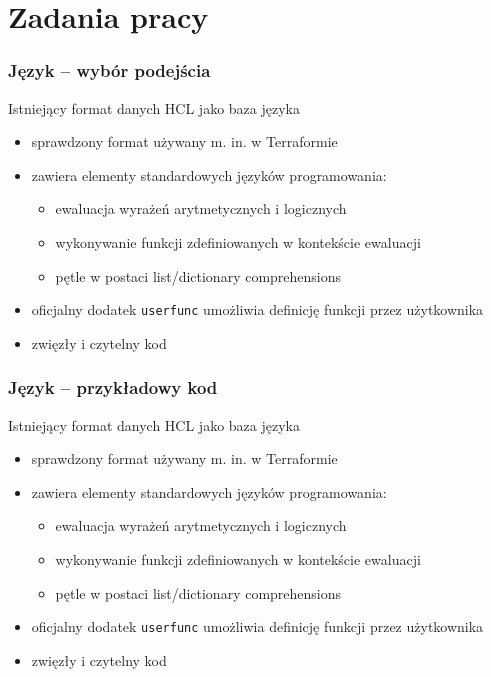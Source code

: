 \documentclass{beamer}
\begin{document}
\section{Zadania pracy}

\begin{frame}
	\frametitle{Język -- wybór podejścia}
	Istniejący format danych HCL jako baza języka
	\begin{itemize}
		\item sprawdzony format używany m. in. w Terraformie\footnotemark
		\item zawiera elementy standardowych języków programowania:
		      \begin{itemize}
			      \item ewaluacja wyrażeń arytmetycznych i logicznych
			      \item wykonywanie funkcji zdefiniowanych w kontekście ewaluacji
			      \item pętle w postaci list/dictionary comprehensions
		      \end{itemize}
		\item oficjalny dodatek {\tt userfunc} umożliwia definicję funkcji przez użytkownika
		\item zwięzły i czytelny kod
	\end{itemize}
\end{frame}

\begin{frame}
	\frametitle{Język -- przykładowy kod}
	Istniejący format danych HCL jako baza języka
	\begin{itemize}
		\item sprawdzony format używany m. in. w Terraformie\footnotemark
		\item zawiera elementy standardowych języków programowania:
		      \begin{itemize}
			      \item ewaluacja wyrażeń arytmetycznych i logicznych
			      \item wykonywanie funkcji zdefiniowanych w kontekście ewaluacji
			      \item pętle w postaci list/dictionary comprehensions
		      \end{itemize}
		\item oficjalny dodatek {\tt userfunc} umożliwia definicję funkcji przez użytkownika
		\item zwięzły i czytelny kod
	\end{itemize}
\end{frame}
\end{document}
